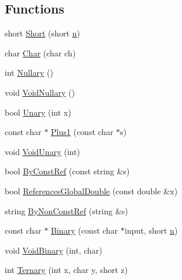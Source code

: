 \subsection*{Functions}
\begin{DoxyCompactItemize}
\item 
short \hyperlink{namespacetesting_1_1gmock__more__actions__test_a00503d3168f1123e314c0d42b7e10b88}{Short} (short \hyperlink{app_2main_8cpp_acfc02ec89670db29251fda6a66602ce2}{n})
\item 
char \hyperlink{namespacetesting_1_1gmock__more__actions__test_af69e6906d734a99d60480e4291891d66}{Char} (char ch)
\item 
int \hyperlink{namespacetesting_1_1gmock__more__actions__test_acdd2dd80f777fdb770b513b63064ac19}{Nullary} ()
\item 
void \hyperlink{namespacetesting_1_1gmock__more__actions__test_a061f6d66383a4e793b4d4ca93bd8ca2f}{Void\+Nullary} ()
\item 
bool \hyperlink{namespacetesting_1_1gmock__more__actions__test_aad456ea2ee1b0cb2741b676a34f540a3}{Unary} (int x)
\item 
const char $\ast$ \hyperlink{namespacetesting_1_1gmock__more__actions__test_a986ada18d3311d3fa3a7c33e54e18f33}{Plus1} (const char $\ast$s)
\item 
void \hyperlink{namespacetesting_1_1gmock__more__actions__test_a163632ef644604032f00334fce36de1a}{Void\+Unary} (int)
\item 
bool \hyperlink{namespacetesting_1_1gmock__more__actions__test_ab175725bcdacf7a00948c7d5c1a36419}{By\+Const\+Ref} (const string \&s)
\item 
bool \hyperlink{namespacetesting_1_1gmock__more__actions__test_ae2d3dddc96f5657127593f129cd3fc51}{References\+Global\+Double} (const double \&x)
\item 
string \hyperlink{namespacetesting_1_1gmock__more__actions__test_ac0099e2d9f40351252df31feda822b71}{By\+Non\+Const\+Ref} (string \&s)
\item 
const char $\ast$ \hyperlink{namespacetesting_1_1gmock__more__actions__test_a853c9f048674a60798b930750b74a1df}{Binary} (const char $\ast$input, short \hyperlink{app_2main_8cpp_acfc02ec89670db29251fda6a66602ce2}{n})
\item 
void \hyperlink{namespacetesting_1_1gmock__more__actions__test_aec71bd163ae67ec97e073bd13a4ac039}{Void\+Binary} (int, char)
\item 
int \hyperlink{namespacetesting_1_1gmock__more__actions__test_ab98b352528a0b72625b4710a6fc648a1}{Ternary} (int x, char y, short z)

\end{DoxyCompactItemize}
